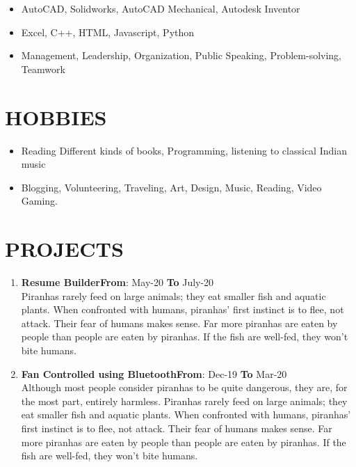 \documentclass{article}
\begin{document}
\vspace{3pt}
\begin{itemize}[noitemsep,nolistsep]
	\item AutoCAD, Solidworks, AutoCAD Mechanical, Autodesk Inventor
	\item Excel, C++, HTML, Javascript, Python
	\item Management, Leadership, Organization, Public Speaking, Problem-solving, Teamwork
\end{itemize}
\vspace{3pt}

\section*{\large{\uppercase{Hobbies}}}

\vspace{3pt}
\begin{itemize}[noitemsep,nolistsep]
	\item Reading Different kinds of books, Programming, listening to classical Indian music
	\item Blogging, Volunteering, Traveling, Art, Design, Music, Reading, Video Gaming.
\end{itemize}

\vspace{3pt}
\section*{\large{\uppercase{projects}}}

\vspace{3pt}
\begin{enumerate}
	\item {\textbf{Resume Builder}}\hfill {\textbf{From}}: May-20 {\textbf{To}} July-20\\
	Piranhas rarely feed on large animals; they eat smaller fish and aquatic plants. When confronted with humans, piranhas’ first instinct is to flee, not attack. Their fear of humans makes sense. Far more piranhas are eaten by people than people are eaten by piranhas. If the fish are well-fed, they won’t bite humans.
	\item {\textbf{Fan Controlled using Bluetooth}}\hfill {\textbf{From}}: Dec-19 {\textbf{To}} Mar-20\\
	Although most people consider piranhas to be quite dangerous, they are, for the most part, entirely harmless. Piranhas rarely feed on large animals; they eat smaller fish and aquatic plants. When confronted with humans, piranhas’ first instinct is to flee, not attack. Their fear of humans makes sense. Far more piranhas are eaten by people than people are eaten by piranhas. If the fish are well-fed, they won’t bite humans.
\end{enumerate}
	
\end{document}
